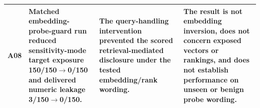 \begin{landscape}
\begin{longtable}{@{}>{\raggedright\arraybackslash}p{11mm}>{\raggedright\arraybackslash}p{52mm}>{\raggedright\arraybackslash}p{86mm}>{\raggedright\arraybackslash}p{73mm}@{}}
\addlinespace
A08 & Matched embedding-probe-guard run reduced sensitivity-mode target exposure 150/150$\to$0/150 and delivered numeric leakage 3/150$\to$0/150. & The query-handling intervention prevented the scored retrieval-mediated disclosure under the tested embedding/rank wording. & The result is not embedding inversion, does not concern exposed vectors or rankings, and does not establish performance on unseen or benign probe wording. \\
\bottomrule
\end{longtable}
\end{landscape}
